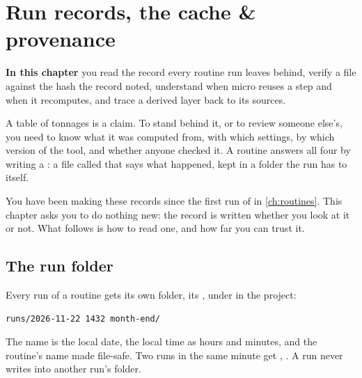 \chapter{Run records, the cache \& provenance}\label{ch:records}
\begin{goals}
\textbf{In this chapter} you read the record every routine run leaves behind, verify a file against the hash the record noted, understand when micro reuses a step and when it recomputes, and trace a derived layer back to its sources.
\end{goals}

A table of tonnages is a claim. To stand behind it, or to review someone else's, you need to know what it was computed from, with which settings, by which version of the tool, and whether anyone checked it. A routine answers all four by writing a : a file called  that says what happened, kept in a folder the run has to itself.

You have been making these records since the first run of  in \cref{ch:routines}. This chapter asks you to do nothing new: the record is written whether you look at it or not. What follows is how to read one, and how far you can trust it.

\section{The run folder}\label{sec:records-folder}
Every run of a routine gets its own folder, its , under  in the project:

\begin{lstlisting}
runs/2026-11-22 1432 month-end/
\end{lstlisting}

The name is the local date, the local time as hours and minutes, and the routine's name made file-safe. Two runs in the same minute get , . A run never writes into another run's folder.

